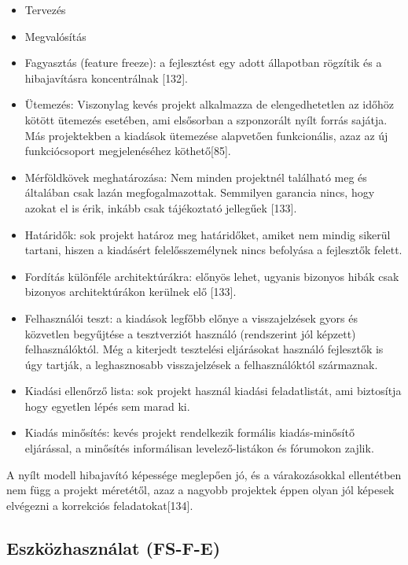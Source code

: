 \documentclass[12pt,magyar,a4paper,oneside]{scrreprt}
\providecommand{\tightlist}{%
  \setlength{\itemsep}{0pt}\setlength{\parskip}{0pt}}
\begin{document}
\begin{itemize}
\tightlist
\item
  Tervezés
\item
  Megvalósítás
\item
  Fagyasztás (feature freeze): a fejlesztést egy adott állapotban
  rögzítik és a hibajavításra koncentrálnak {[}132{]}.
\item
  Ütemezés: Viszonylag kevés projekt alkalmazza de elengedhetetlen az
  időhöz kötött ütemezés esetében, ami elsősorban a szponzorált nyílt
  forrás sajátja. Más projektekben a kiadások ütemezése alapvetően
  funkcionális, azaz az új funkciócsoport megjelenéséhez
  köthető{[}85{]}.
\item
  Mérföldkövek meghatározása: Nem minden projektnél található meg és
  általában csak lazán megfogalmazottak. Semmilyen garancia nincs, hogy
  azokat el is érik, inkább csak tájékoztató jellegűek {[}133{]}.
\item
  Határidők: sok projekt határoz meg határidőket, amiket nem mindig
  sikerül tartani, hiszen a kiadásért felelősszemélynek nincs befolyása
  a fejlesztők felett.
\item
  Fordítás különféle architektúrákra: előnyös lehet, ugyanis bizonyos
  hibák csak bizonyos architektúrákon kerülnek elő {[}133{]}.
\item
  Felhasználói teszt: a kiadások legfőbb előnye a visszajelzések gyors
  és közvetlen begyűjtése a tesztverziót használó (rendszerint jól
  képzett) felhasználóktól. Még a kiterjedt tesztelési eljárásokat
  használó fejlesztők is úgy tartják, a leghasznosabb visszajelzések a
  felhasználóktól származnak.
\item
  Kiadási ellenőrző lista: sok projekt használ kiadási feladatlistát,
  ami biztosítja hogy egyetlen lépés sem marad ki.
\item
  Kiadás minősítés: kevés projekt rendelkezik formális kiadás-minősítő
  eljárással, a minősítés informálisan levelező-listákon és fórumokon
  zajlik.
\end{itemize}

A nyílt modell hibajavító képessége meglepően jó, és a várakozásokkal
ellentétben nem függ a projekt méretétől, azaz a nagyobb projektek éppen
olyan jól képesek elvégezni a korrekciós feladatokat{[}134{]}.

\hypertarget{sec:FS-F-E}{%
\subsection{Eszközhasználat (FS-F-E)}\label{sec:FS-F-E}}
\end{document}
